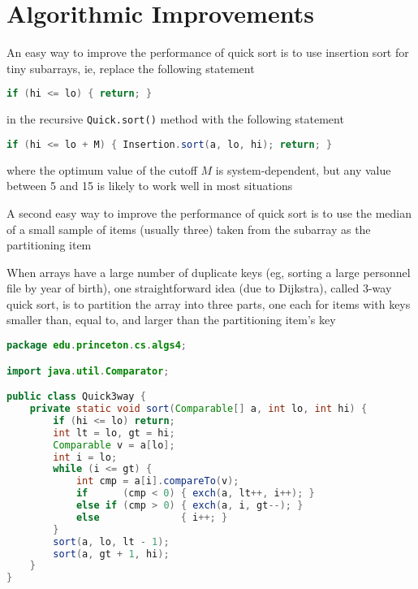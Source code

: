 \documentclass[8pt,a4paper,compress]{beamer}
\begin{document}
\section{Algorithmic Improvements}
\begin{frame}[fragile]
\pause

An easy way to improve the performance of quick sort is to use insertion sort for tiny subarrays, ie, replace the following statement 
\begin{lstlisting}[language=Java]
if (hi <= lo) { return; }
\end{lstlisting}
in the recursive \lstinline{Quick.sort()} method with the following statement
\begin{lstlisting}[language=Java]
if (hi <= lo + M) { Insertion.sort(a, lo, hi); return; }
\end{lstlisting}
where the optimum value of the cutoff $M$ is system-dependent, but any value between 5 and 15 is likely to work well in most situations

\pause
\bigskip

A second easy way to improve the performance of quick sort is to use the median of a small sample of items (usually three) taken from the subarray as the partitioning item
\end{frame}

\begin{frame}[fragile]
\pause

When arrays have a large number of duplicate keys (eg, sorting a large personnel file by year of birth), one straightforward idea (due to Dijkstra), called 3-way quick sort, is to partition the array into three parts, one each for items with keys smaller than, equal to, and larger than the partitioning item's key

\pause

\begin{lstlisting}[language=Java]
package edu.princeton.cs.algs4;

import java.util.Comparator;

public class Quick3way {
    private static void sort(Comparable[] a, int lo, int hi) { 
        if (hi <= lo) return;
        int lt = lo, gt = hi;
        Comparable v = a[lo];
        int i = lo;
        while (i <= gt) {
            int cmp = a[i].compareTo(v);
            if      (cmp < 0) { exch(a, lt++, i++); }
            else if (cmp > 0) { exch(a, i, gt--); }
            else              { i++; }
        }
        sort(a, lo, lt - 1);
        sort(a, gt + 1, hi);
    }
}
\end{lstlisting}
\end{frame}
\end{document}
